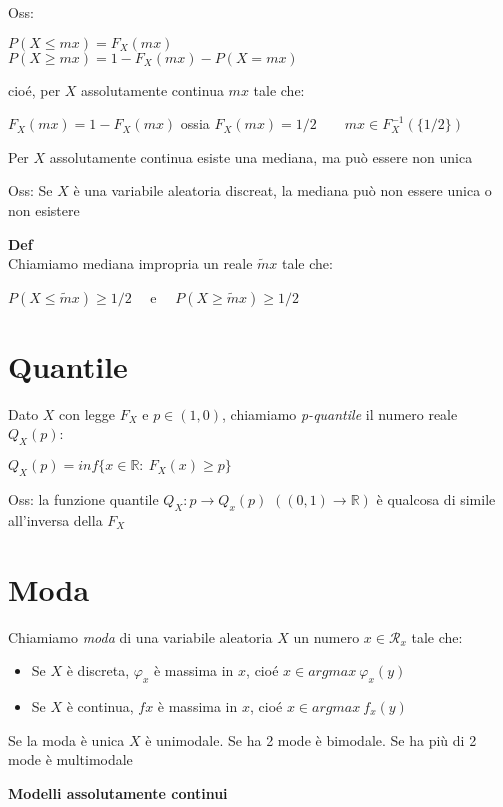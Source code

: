 \documentclass[12pt, a4paper]{article}
\begin{document}
\newpage
Oss:
\begin{center}
    $P(X\leq mx)=F_{X}(mx)$\\
    $P(X\geq mx)=1-F_{X}(mx)-P(X=mx)$
\end{center}
cioé, per $X$ assolutamente continua $mx$ tale che:
\begin{center}
    $F_{X}(mx)=1-F_{X}(mx)$ ossia $F_{X}(mx)=1/2\qquad mx\in F_{X}^{-1}(\{1/2\})$
\end{center}
Per $X$ assolutamente continua esiste una mediana, ma può essere non unica

Oss: Se $X$ è  una variabile aleatoria discreat, la mediana può non essere unica o non esistere

\textbf{Def}\\ Chiamiamo mediana impropria un reale $\widetilde{m}x$ tale che:
\begin{center}
    $P(X\leq\widetilde{m}x)\geq 1/2\quad$ e $\quad P(X\geq\widetilde{m}x)\geq 1/2$    
\end{center}

\section{Quantile}
Dato $X$ con legge $F_{X}$ e $p\in(1,0)$, chiamiamo \textit{p-quantile} il numero reale $Q_{X}(p)$:
\begin{center}
    $Q_{X}(p)=inf\{x\in\mathbb{R}:\ F_{X}(x)\geq p\}$
\end{center}

Oss: la funzione quantile $Q_{X}:p\rightarrow Q_{x}(p)$ $((0,1)\rightarrow\mathbb{R})$ è qualcosa di simile
all'inversa della $F_{X}$

\section{Moda}
Chiamiamo \textit{moda} di una variabile aleatoria $X$ un numero $x\in\mathcal{R}_{x}$ tale che:
\begin{itemize}
    \item Se $X$ è discreta, $\varphi_{x}$ è massima in $x$, cioé $x\in argmax\ \varphi_{x}(y)$
    \item Se $X$ è continua, $f{x}$ è massima in $x$, cioé $x\in argmax\ f_{x}(y)$
\end{itemize}

Se la moda è unica $X$ è unimodale. Se ha 2 mode è bimodale. Se ha più di 2 mode è multimodale

\newpage
\textbf{Modelli assolutamente continui}
\end{document}
